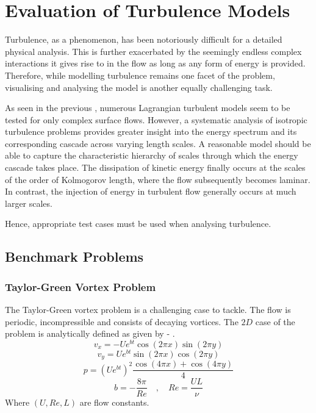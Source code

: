 
\chapter{Evaluation of Turbulence Models}

\label{chap:evaluation-of-turbulence-models}

Turbulence, as a phenomenon, has been notoriously difficult for a detailed physical analysis. This is further exacerbated by the seemingly endless complex interactions it gives rise to in the flow as long as any form of energy is provided.
Therefore, while modelling turbulence remains one facet of the problem, visualising and analysing the model is another equally challenging task.

As seen in the previous , numerous Lagrangian turbulent models seem to be tested for only complex surface flows. However, a systematic analysis of isotropic turbulence problems provides greater insight into the energy spectrum and its corresponding cascade across varying length scales. A reasonable model should be able to capture the characteristic hierarchy of scales through which the energy cascade takes place. The dissipation of kinetic energy finally occurs at the scales of the order of Kolmogorov length, where the flow subsequently becomes laminar. In contrast, the injection of energy in turbulent flow generally occurs at much larger scales.

Hence, appropriate test cases must be used when analysing turbulence.

\section{Benchmark Problems}
\subsection{Taylor-Green Vortex Problem}
\label{sec:taylor-green-vortex-problem}
The Taylor-Green vortex problem is a challenging case to tackle. The flow is periodic, incompressible and consists of decaying vortices.
The $2D$ case of the problem is analytically defined as given by  - .
\begin{equation}
    v_x = -U e^{bt} \cos(2\pi x) \sin(2\pi y)
    \label{eq:2d-tgv-vx}
\end{equation}
\begin{equation}
    v_y = U e^{bt} \sin(2\pi x) \cos(2\pi y)
    \label{eq:2d-tgv-vy}
\end{equation}
\begin{equation}
    p = (U e^{bt})^2 \frac{\cos(4\pi x) + \cos(4\pi y)}{4}
    \label{eq:2d-tgv-p}
\end{equation}
\begin{equation}
    b = -\frac{8\pi}{Re} \quad , \quad Re = \frac{UL}{\nu}
\end{equation}
Where $(U, Re, L)$ are flow constants.

